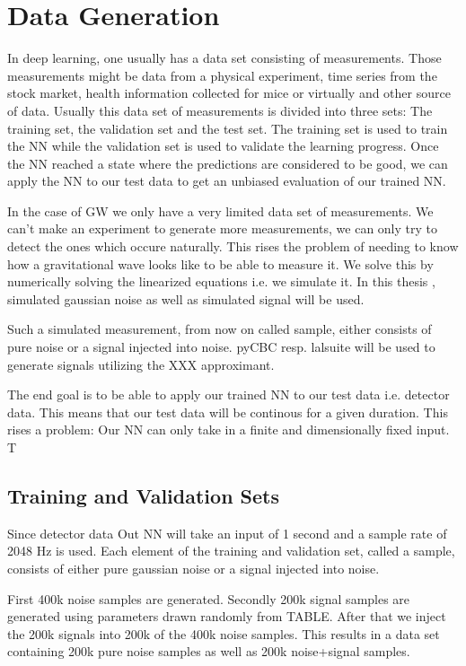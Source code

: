 
\section{Data Generation}
In deep learning, one usually has a data set consisting of measurements. 
Those measurements might be data from a physical experiment, time series from
the stock market, health information collected for mice or virtually and
other source of data. Usually this data set
of measurements is divided into three sets: The training set, the validation set
and the test set. The training set is used to train the NN while the validation
set is used to validate the learning progress. Once the NN reached a state where
the predictions are considered to be good, we can apply the NN to our test data
to get an unbiased evaluation of our trained NN.

In the case of GW we only have a very limited data set of measurements. We can't
make an experiment to generate more measurements, we can only try to detect the
ones which occure naturally. This rises the problem of needing to know how a
gravitational wave looks like to be able to measure it. We solve this by
numerically solving the linearized equations i.e. we simulate it. In this thesis
, simulated gaussian noise as well as simulated signal will be used.

Such a simulated measurement, from now on called sample, either consists of pure
noise or a signal injected into noise. pyCBC resp. lalsuite will be used to 
generate signals utilizing the XXX approximant. 

The end goal is to be able to apply our trained NN to our test data i.e.
detector data. This means that our test data will be continous for a given
duration. This rises a problem: Our NN can only take in a finite and
dimensionally fixed input. T
\subsection{Training and Validation Sets}
Since detector data
Out NN will take an input of 1 second and a sample rate of 2048 Hz is used. 
Each element of the training and validation set, called a sample, consists of
either pure gaussian noise or a signal injected into noise.

First 400k noise samples are generated. Secondly 200k signal samples are
generated using parameters drawn randomly from TABLE. After that we inject the
200k signals into 200k of the 400k noise samples. This results in a data set
containing 200k pure noise samples as well as 200k noise+signal samples.

